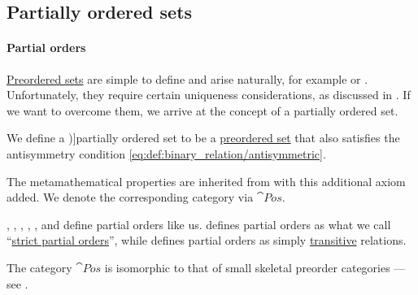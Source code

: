 \subsection{Partially ordered sets}\label{subsec:partially_ordered_sets}

\paragraph{Partial orders}

\hyperref[def:preordered_set]{Preordered sets} are simple to define and arise naturally, for example  or . Unfortunately, they require certain uniqueness considerations, as discussed in . If we want to overcome them, we arrive at the concept of a partially ordered set.

\begin{definition}\label{def:partially_ordered_set}
  We define a \term[ru=частично упорядоченное множество (\cite[72]{Гуров2013Решётки})]{partially ordered set} to be a \hyperref[def:preordered_set]{preordered set} that also satisfies the antisymmetry condition \eqref{eq:def:binary_relation/antisymmetric}.
\end{definition}
\begin{comments}
  \item The metamathematical properties are inherited from  with this additional axiom added. We denote the corresponding category via \( \cat{Pos} \).

  \item {}, , , , ,  and  define partial orders like us.  defines partial orders as what we call \enquote{\hyperref[def:strict_partial_order]{strict partial orders}}, while  defines partial orders as simply \hyperref[def:binary_relation/transitive]{transitive} relations.

  \item The category \( \cat{Pos} \) is isomorphic to that of small skeletal preorder categories --- see .
\end{comments}

